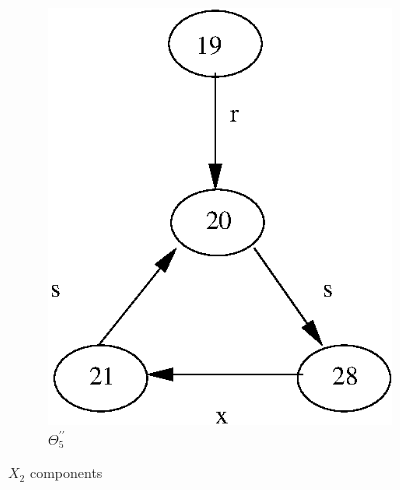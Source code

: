 \documentclass[a4paper,12pt]{article}
\numberwithin{equation}{section}
\numberwithin{figure}{section}
\begin{document}
\begin{figure}
\begin{center}
\begin{subfigure}[b]{.3\columnwidth}
\includegraphics[scale=0.5, angle=90, bb=0 0 82 210]{python/ex_K_j4.eps}
\caption{$\Theta_5^{\prime\prime}$}
\label{fig:K_j4}
\end{subfigure}
\end{center}
\caption{$X_2$ components}
\label{fig:KY5}
\end{figure}
\end{document}
